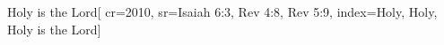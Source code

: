 {Holy is the Lord}[
    cr={2010},
    sr={Isaiah 6:3, Rev 4:8, Rev 5:9},
    index={Holy, Holy, Holy is the Lord}]
